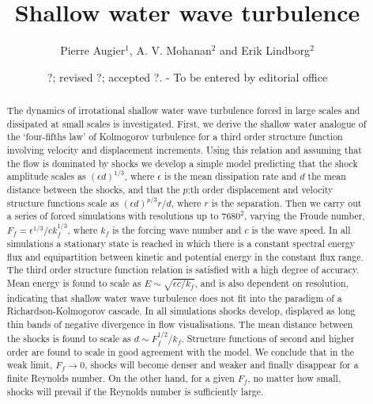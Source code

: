 \documentclass{jfm}
\title[Shallow water wave turbulence]%
{ Shallow water wave turbulence}
\author[P. Augier, A.V. Mohanan and E. Lindborg]%
{Pierre Augier$^{1}$,   A. V. Mohanan$^{2}$
and Erik Lindborg$^2$ \ns }
\affiliation{$^2$ KTH Mechanics,
SE-100 44 Stockholm, Sweden\\[\affilskip]
$^1$ LEGI, BP53,
38041 Grenoble Cedex, France}
\date{?; revised ?; accepted ?. - To be entered by editorial office}
\begin{document}
\maketitle



\begin{abstract}

The dynamics of irrotational shallow water wave turbulence forced in large
scales and dissipated at small scales is investigated. First, we derive the
shallow water analogue of the `four-fifths law' of Kolmogorov turbulence
for a third order structure function involving velocity and displacement
increments. Using this relation and assuming that the flow is dominated by
shocks we develop a simple model predicting that the shock amplitude scales as
$ (\epsilon d)^{1/3} $, where $ \epsilon $ is the mean dissipation rate and $ d $
the mean distance between the shocks, and that the $ p $:th order displacement
and velocity structure functions scale as $ (\epsilon d)^{p/3} r/d $, where $ r $
is the separation. Then we carry out a series of forced simulations with
resolutions up to $7680^2$, varying the Froude number, $F_{f} = \epsilon^{1/3} /
ck_f^{1/3} $, where $ k_f $ is the forcing wave number and $c$ is the wave
speed. In all simulations a stationary state is reached in which there is a
constant spectral energy flux and equipartition between kinetic and potential
energy in the constant flux range. The third order structure function relation
is satisfied with a high degree of accuracy. Mean energy is found to scale as $
E \sim \sqrt{\epsilon c/k_f} $, and is also dependent on resolution, indicating
that shallow water wave turbulence does not fit into the paradigm of a
Richardson-Kolmogorov cascade. In all simulations shocks develop, displayed as
long thin bands of negative divergence in flow visualisations. The mean
distance between the shocks is found to scale as $ d \sim F_f^{1/2}/k_f $.
Structure functions of second and higher order are found to scale in good
agreement with the model. We conclude that in the weak limit, $ F_f \rightarrow
0 $, shocks will become denser and weaker and finally disappear for a finite
Reynolds number. On the other hand, for a given $ F_{f} $, no matter how small,
shocks will prevail if the Reynolds number is sufficiently large.

\end{abstract}

\end{document}
